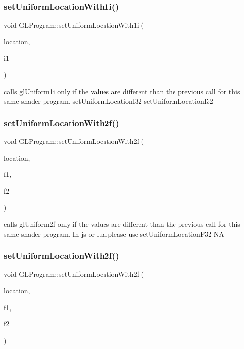 \subsubsection{\texorpdfstring{set\+Uniform\+Location\+With1i()}{setUniformLocationWith1i()}\hspace{0.1cm}{\footnotesize\ttfamily [2/2]}}
{\footnotesize\ttfamily void G\+L\+Program\+::set\+Uniform\+Location\+With1i (\begin{DoxyParamCaption}\item[{G\+Lint}]{location,  }\item[{G\+Lint}]{i1 }\end{DoxyParamCaption})}

calls gl\+Uniform1i only if the values are different than the previous call for this same shader program.  set\+Uniform\+Location\+I32  set\+Uniform\+Location\+I32 \mbox{\label{classGLProgram_a3b762779b30cea82590314538843db9a}} 
\subsubsection{\texorpdfstring{set\+Uniform\+Location\+With2f()}{setUniformLocationWith2f()}\hspace{0.1cm}{\footnotesize\ttfamily [1/2]}}
{\footnotesize\ttfamily void G\+L\+Program\+::set\+Uniform\+Location\+With2f (\begin{DoxyParamCaption}\item[{G\+Lint}]{location,  }\item[{G\+Lfloat}]{f1,  }\item[{G\+Lfloat}]{f2 }\end{DoxyParamCaption})}

calls gl\+Uniform2f only if the values are different than the previous call for this same shader program. In js or lua,please use set\+Uniform\+Location\+F32  NA \mbox{\label{classGLProgram_a3b762779b30cea82590314538843db9a}} 
\subsubsection{\texorpdfstring{set\+Uniform\+Location\+With2f()}{setUniformLocationWith2f()}\hspace{0.1cm}{\footnotesize\ttfamily [2/2]}}
{\footnotesize\ttfamily void G\+L\+Program\+::set\+Uniform\+Location\+With2f (\begin{DoxyParamCaption}\item[{G\+Lint}]{location,  }\item[{G\+Lfloat}]{f1,  }\item[{G\+Lfloat}]{f2 }\end{DoxyParamCaption})}

